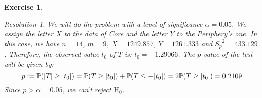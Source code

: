 \documentclass[10pt,a4paper]{article}
\theoremstyle{plain}
\newtheorem{exercice}{Exercise}
\theoremstyle{remark}
\newtheorem*{resolution}{Resolution}
\newcommand{\Prob}{\ensuremath{\mathbb{P}}} %
\begin{document}
\begin{exercice}
\begin{enumerate}
\begin{resolution}
            We will do the problem with a level of significance $\alpha=0.05$. We assign the letter $X$ to the data of Core and the letter $Y$ to the Periphery's one. In this case, we have $n=14$, $m=9$, $\overline{X}=1249.857$, $\overline{Y}=1261.333$ and ${S_p}^2=433.129$. Therefore, the observed value $t_0$ of $T$ is: $t_0=-1.29066$. The $p$-value of the test will be given by:
            $$p:=\Prob(\abs{T}\geq\abs{t_0})=\Prob(T\geq\abs{t_0})+\Prob(T\leq -\abs{t_0})=2\Prob(T\geq\abs{t_0})=0.2109$$
            Since $p>\alpha=0.05$, we can't reject $\text{H}_0$.
          \end{resolution}
  \end{enumerate}
\end{exercice}
\end{document}
